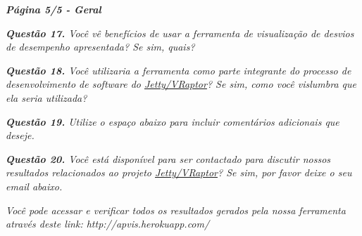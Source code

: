 \begin{framed}
	\noindent \textit{\textbf{Página 5/5 - Geral}}
	\par
	\noindent \textit{\textbf{Questão 17.} Você vê benefícios de usar a ferramenta de visualização de desvios de desempenho apresentada? Se sim, quais?}
	\par
	\noindent \textit{\textbf{Questão 18.} Você utilizaria a ferramenta como parte integrante do processo de desenvolvimento de software do \underline{Jetty/VRaptor}? Se sim, como você vislumbra que ela seria utilizada?}
	\par
	\noindent \textit{\textbf{Questão 19.} Utilize o espaço abaixo para incluir comentários adicionais que deseje.}
	\par
	\noindent \textit{\textbf{Questão 20.} Você está disponível para ser contactado para discutir nossos resultados relacionados ao projeto \underline{Jetty/VRaptor}? Se sim, por favor deixe o seu email abaixo.}

	\noindent \textit{Você pode acessar e verificar todos os resultados gerados pela nossa ferramenta através deste link: http://apvis.herokuapp.com/}
\end{framed}